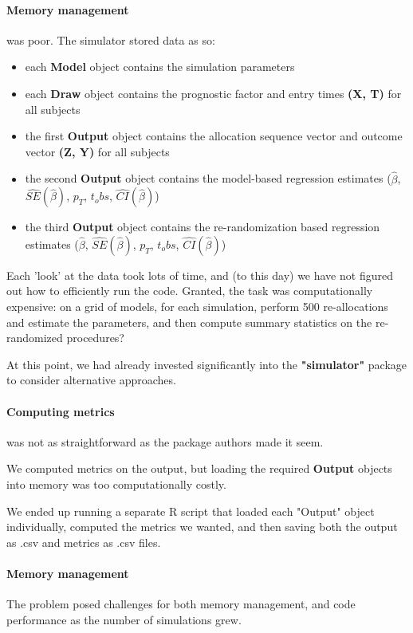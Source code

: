 \paragraph{Memory management} was poor. 
The simulator stored data as so:
\begin{itemize}
	\item each \textbf{Model} object contains the simulation parameters
	\item each \textbf{Draw} object contains the prognostic factor and entry times \textbf{(X, T)} for all subjects 
	\item the first \textbf{Output} object contains the allocation sequence vector and outcome vector \textbf{(Z, Y)} for all subjects
	\item the second \textbf{Output} object contains the model-based regression estimates ($\hat{\beta}$, $\hat{SE}(\hat{\beta})$, $p_T$, $t_obs$, $\hat{CI}(\hat{\beta})$)
	\item the third \textbf{Output} object contains the re-randomization based regression estimates ($\hat{\beta}$, $\hat{SE}(\hat{\beta})$, $p_T$, $t_obs$, $\hat{CI}(\hat{\beta})$)
\end{itemize}

Each 'look' at the data took lots of time, and (to this day) we have not figured out how to efficiently run the code.
Granted, the task was computationally expensive: on a grid of models, for each simulation, perform 500 re-allocations and estimate the parameters, and then compute summary statistics on the re-randomized procedures? 

At this point, we had already invested significantly into the \textbf{"simulator"} package to consider alternative approaches.

\paragraph{Computing metrics} was not as straightforward as the package authors made it seem.

We computed metrics on the output, but loading the required \textbf{Output} objects into memory was too computationally costly.

We ended up running a separate R script that loaded each "Output" object individually, computed the metrics we wanted, and then saving both the output as .csv and metrics as .csv files.

\paragraph{Memory management} 
The problem posed challenges for both memory management, and code performance as the number of simulations grew. 

